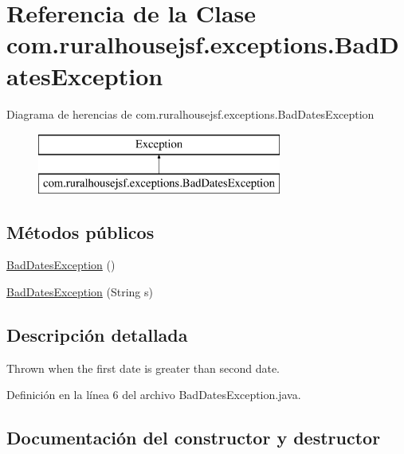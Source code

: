 \hypertarget{classcom_1_1ruralhousejsf_1_1exceptions_1_1_bad_dates_exception}{}\section{Referencia de la Clase com.\+ruralhousejsf.\+exceptions.\+Bad\+Dates\+Exception}
\label{classcom_1_1ruralhousejsf_1_1exceptions_1_1_bad_dates_exception}
Diagrama de herencias de com.\+ruralhousejsf.\+exceptions.\+Bad\+Dates\+Exception\begin{figure}[H]
\begin{center}
\leavevmode
\includegraphics[height=2.000000cm]{classcom_1_1ruralhousejsf_1_1exceptions_1_1_bad_dates_exception}
\end{center}
\end{figure}
\subsection*{Métodos públicos}
\begin{DoxyCompactItemize}
\item 
\mbox{\hyperlink{classcom_1_1ruralhousejsf_1_1exceptions_1_1_bad_dates_exception_a0e519d0653a6b74703c8d586c3dca1bc}{Bad\+Dates\+Exception}} ()
\item 
\mbox{\hyperlink{classcom_1_1ruralhousejsf_1_1exceptions_1_1_bad_dates_exception_ace7222589b4c31c6b4a3d44d952c512a}{Bad\+Dates\+Exception}} (String s)
\end{DoxyCompactItemize}


\subsection{Descripción detallada}
Thrown when the first date is greater than second date. 

Definición en la línea 6 del archivo Bad\+Dates\+Exception.\+java.



\subsection{Documentación del constructor y destructor}
\mbox{\label{classcom_1_1ruralhousejsf_1_1exceptions_1_1_bad_dates_exception_a0e519d0653a6b74703c8d586c3dca1bc}} 
